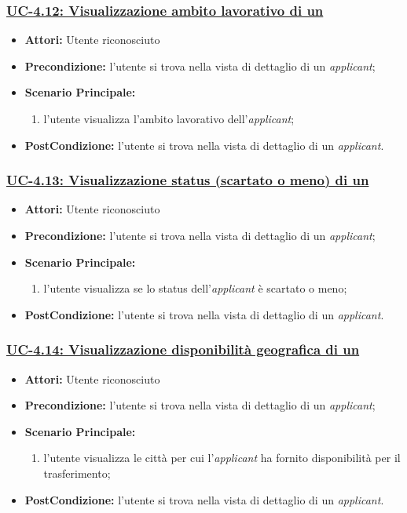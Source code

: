 \subsubsection{\underline{UC-4.12: Visualizzazione ambito lavorativo di un \applicant}}
\begin{itemize}
	\item \textbf{Attori:} Utente riconosciuto
	\item \textbf{Precondizione:} l'utente si trova nella vista di dettaglio di un \textit{applicant};
	\item \textbf{Scenario Principale:}
	\begin{enumerate} 
		\item l'utente visualizza l'ambito lavorativo dell'\textit{applicant};
	\end{enumerate}
	\item \textbf{PostCondizione:} l'utente si trova nella vista di dettaglio di un \textit{applicant}.
\end{itemize}

\subsubsection{\underline{UC-4.13: Visualizzazione status (scartato o meno) di un \applicant}}
\begin{itemize}
	\item \textbf{Attori:} Utente riconosciuto
	\item \textbf{Precondizione:} l'utente si trova nella vista di dettaglio di un \textit{applicant};
	\item \textbf{Scenario Principale:}
	\begin{enumerate} 
		\item l'utente visualizza se lo status dell'\textit{applicant} è scartato o meno;
	\end{enumerate}
	\item \textbf{PostCondizione:} l'utente si trova nella vista di dettaglio di un \textit{applicant}.
\end{itemize}

\subsubsection{\underline{UC-4.14: Visualizzazione disponibilità geografica di un \applicant}}
\begin{itemize}
	\item \textbf{Attori:} Utente riconosciuto
	\item \textbf{Precondizione:} l'utente si trova nella vista di dettaglio di un \textit{applicant};
	\item \textbf{Scenario Principale:}
	\begin{enumerate} 
		\item l'utente visualizza le città per cui l'\textit{applicant} ha fornito disponibilità per il trasferimento;
	\end{enumerate}
	\item \textbf{PostCondizione:} l'utente si trova nella vista di dettaglio di un \textit{applicant}.
\end{itemize}


